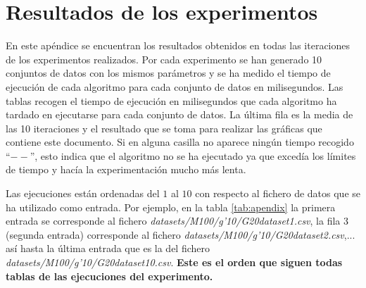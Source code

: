 \documentclass[oneside,openright,titlepage,numbers=noenddot,openany,headinclude,footinclude=true,
cleardoublepage=empty,abstractoff,BCOR=5mm,paper=a4,fontsize=12pt,main=spanish]{scrreprt}
\begin{document}
\chapter{Resultados de los experimentos}
\label{apendiceb}
 En este apéndice se encuentran los resultados obtenidos en todas las iteraciones de los experimentos realizados. Por cada experimento se han generado 10 conjuntos de datos con los mismos parámetros y se ha medido el tiempo de ejecución de cada algoritmo para cada conjunto de datos en milisegundos. Las tablas recogen el tiempo de ejecución en milisegundos que cada algoritmo ha tardado en ejecutarse para cada conjunto de datos. La última fila es la media de las 10 iteraciones y el resultado que se toma para realizar las gráficas que contiene este documento.  Si en alguna casilla no aparece ningún tiempo recogido ``$- -$'', esto indica que el algoritmo no se ha ejecutado ya que excedía los límites de tiempo y hacía la experimentación mucho más lenta.
 
 Las ejecuciones están ordenadas del $1$ al $10$ con respecto al fichero de datos que se ha utilizado como entrada. Por ejemplo, en la tabla \ref{tab:apendix} la primera entrada se corresponde al fichero \textit{datasets/M100/g'10/G20dataset1.csv}, la fila 3 (segunda entrada) corresponde al fichero \textit{datasets/M100/g'10/G20dataset2.csv},... así hasta la última entrada que es la del fichero \textit{datasets/M100/g'10/G20dataset10.csv}. \textbf{Este es el orden que siguen todas tablas de las ejecuciones del experimento.}
 
\end{document}
